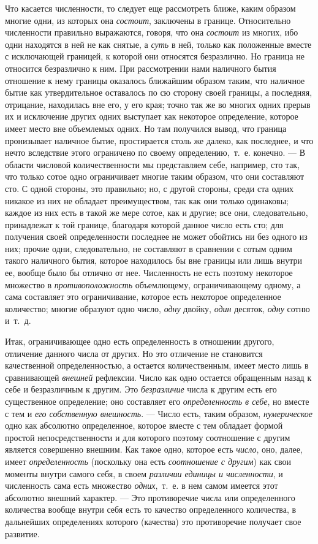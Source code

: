 Что касается численности, то следует еще рассмотреть ближе, каким образом
многие одни, из которых она {\em состоит}, заключены в
границе. Относительно численности правильно выражаются, говоря, что она
{\em состоит} из многих, ибо одни находятся в ней не
как снятые, а {\em суть} в ней, только как положенные
вместе с исключающей границей, к которой они относятся безразлично. Но
граница не относится безразлично к ним. При рассмотрении нами наличного
бытия отношение к нему границы оказалось ближайшим образом таким, что
наличное бытие как утвердительное оставалось по сю сторону своей границы, а
последняя, отрицание, находилась вне его, у его края; точно так же во
многих одних прерыв их и исключение других одних выступает как некоторое
определение, которое имеет место вне объемлемых одних. Но там получился
вывод, что граница пронизывает наличное бытие, простирается столь же
далеко, как последнее, и что нечто вследствие этого ограничено по своему
определению,~т.~е. конечно. — В области числовой количественности мы
представляем себе, например, сто так, что только сотое одно ограничивает
многие таким образом, что они составляют сто. С одной стороны, это
правильно; но, с другой стороны, среди ста одних никакое из них не обладает
преимуществом, так как они только одинаковы; каждое из них есть в такой же
мере сотое, как и другие; все они, следовательно, принадлежат к той
границе, благодаря которой данное число есть сто; для получения своей
определенности последнее не может обойтись ни без одного из них; прочие
одни, следовательно, не составляют в сравнении с сотым одним такого
наличного бытия, которое находилось бы вне границы или лишь внутри ее,
вообще было бы отлично от нее. Численность не есть поэтому некоторое
множество в {\em противоположность} объемлющему,
ограничивающему одному, а сама составляет это ограничивание, которое есть
некоторое определенное количество; многие образуют одно число,
{\em одну} двойку, {\em один}
десяток, {\em одну} сотню и~т.~д.

Итак, ограничивающее одно есть определенность в отношении другого, отличение
данного числа от других. Но это отличение не становится качественной
определенностью, а остается количественным, имеет место лишь в сравнивающей
{\em внешней} рефлексии. Число как одно остается
обращенным назад к себе и безразличным к другим. Это
{\em безразличие} числа к другим есть его существенное
определение; оно составляет его {\em определенность в
себе}, но вместе с тем и {\em его собственную
внешность}. — Число есть, таким образом,
{\em нумерическое} одно как абсолютно определенное,
которое вместе с тем обладает формой простой непосредственности и для
которого поэтому соотношение с другим является совершенно внешним. Как
такое одно, которое есть {\em число}, оно, далее, имеет
{\em определенность} (поскольку она есть
{\em соотношение с другим}) как свои моменты внутри
самого себя, в своем {\em различии единицы и
численности}, и численность сама есть множество
{\em одних},~т.~е. в нем самом имеется этот абсолютно
внешний характер. — Это противоречие числа или определенного количества
вообще внутри себя есть то качество определенного количества, в дальнейших
определениях которого (качества) это противоречие получает свое развитие.

